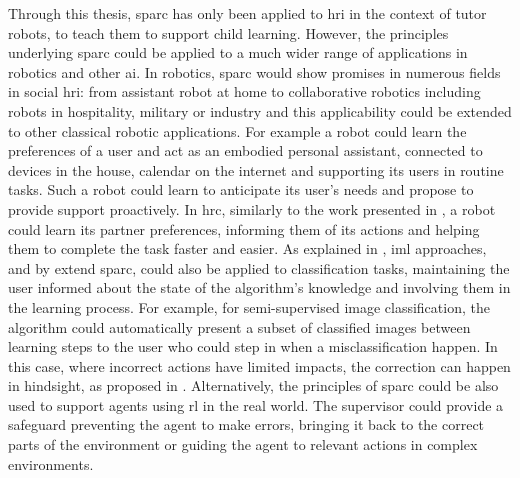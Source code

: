Through this thesis, \gls{sparc} has only been applied to \gls{hri} in the context of tutor robots, to teach them to support child learning. However, the principles underlying \gls{sparc} could be applied to a much wider range of applications in robotics and other \gls{ai}. In robotics, \gls{sparc} would show promises in numerous fields in social \gls{hri}: from assistant robot at home to collaborative robotics including robots in hospitality, military or industry and this applicability could be extended to other classical robotic applications. For example a robot could learn the preferences of a user and act as an embodied personal assistant, connected to devices in the house, calendar on the internet and supporting its users in routine tasks. Such a robot could learn to anticipate its user's needs and propose to provide support proactively. In \gls{hrc}, similarly to the work presented in \cite{munzer2017efficient}, a robot could learn its partner preferences, informing them of its actions and helping them to complete the task faster and easier. As explained in \cite{fails2003interactive}, \gls{iml} approaches, and by extend \gls{sparc}, could also be applied to classification tasks, maintaining the user informed about the state of the algorithm's knowledge and involving them in the learning process. For example, for semi-supervised image classification, the algorithm could automatically present a subset of classified images between learning steps to the user who could step in when a misclassification happen. In this case, where incorrect actions have limited impacts, the correction can happen in hindsight, as proposed in \cite{chernova2009interactive}. Alternatively, the principles of \gls{sparc} could be also used to support agents using \gls{rl} in the real world. The supervisor could provide a safeguard preventing the agent to make errors, bringing it back to the correct parts of the environment or guiding the agent to relevant actions in complex environments.


